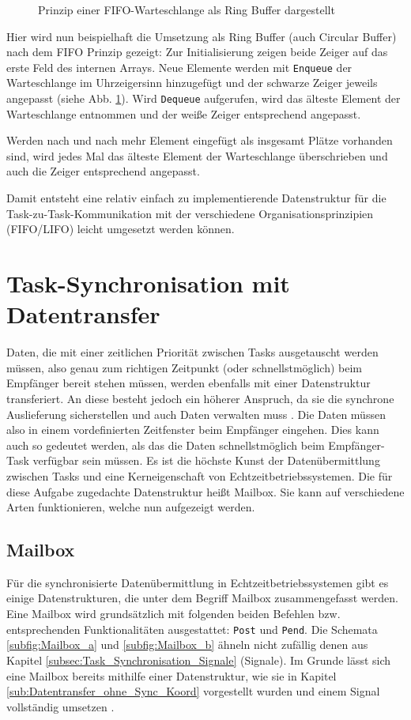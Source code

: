 \documentclass{llncs}
\begin{document}
\begin{figure}
	\centering
	\def\svgwidth{0.30\columnwidth}
	
	\caption{\label{fig:RingBuffer}Prinzip einer FIFO-Warteschlange als Ring Buffer dargestellt \autocite[vgl.][97]{Cooling2017}}
\end{figure}

Hier wird nun beispielhaft die Umsetzung als Ring Buffer (auch Circular Buffer) nach dem FIFO Prinzip gezeigt: Zur Initialisierung zeigen beide Zeiger auf das erste Feld des internen Arrays. Neue Elemente werden mit \texttt{Enqueue} der Warteschlange im Uhrzeigersinn hinzugefügt und der schwarze Zeiger jeweils angepasst (siehe Abb. \ref{fig:RingBuffer}). Wird \texttt{Dequeue} aufgerufen, wird das älteste Element der Warteschlange entnommen und der weiße Zeiger entsprechend angepasst.

Werden nach und nach mehr Element eingefügt als insgesamt Plätze vorhanden sind, wird jedes Mal das älteste Element der Warteschlange überschrieben und auch die Zeiger entsprechend angepasst.

Damit entsteht eine relativ einfach zu implementierende Datenstruktur für die Task-zu-Task-Kommunikation mit der verschiedene Organisationsprinzipien (FIFO/LIFO) leicht umgesetzt werden können.

\section{Task-Synchronisation mit Datentransfer}
\label{sub:Task_Synchronisation_Datentransfer}
Daten, die mit einer zeitlichen Priorität zwischen Tasks ausgetauscht werden müssen, also genau zum richtigen Zeitpunkt (oder schnellstmöglich) beim Empfänger bereit stehen müssen, werden ebenfalls mit einer Datenstruktur transferiert. An diese besteht jedoch ein höherer Anspruch, da sie die synchrone Auslieferung sicherstellen und auch Daten verwalten muss \autocite[vgl.][99]{Cooling2017}. Die Daten müssen also in einem vordefinierten Zeitfenster beim Empfänger eingehen. Dies kann auch so gedeutet werden, als das die Daten schnellstmöglich beim Empfänger-Task verfügbar sein müssen. Es ist die höchste Kunst der Datenübermittlung zwischen Tasks und eine Kerneigenschaft von Echtzeitbetriebssystemen. Die für diese Aufgabe zugedachte Datenstruktur heißt Mailbox. Sie kann auf verschiedene Arten funktionieren, welche nun aufgezeigt werden.

\subsection{Mailbox}
Für die synchronisierte Datenübermittlung in Echtzeitbetriebssystemen gibt es einige Datenstrukturen, die unter dem Begriff Mailbox zusammengefasst werden. Eine Mailbox wird grundsätzlich mit folgenden beiden Befehlen bzw. entsprechenden Funktionalitäten ausgestattet:
\texttt{Post} und \texttt{Pend}. Die Schemata \ref{subfig:Mailbox_a} und \ref{subfig:Mailbox_b} ähneln nicht zufällig denen aus Kapitel \ref{subsec:Task_Synchronisation_Signale} (Signale). Im Grunde lässt sich eine Mailbox bereits mithilfe einer Datenstruktur, wie sie in Kapitel \ref{sub:Datentransfer_ohne_Sync_Koord} vorgestellt wurden und einem Signal vollständig umsetzen \autocite[vgl.][99]{Cooling2017}.
\end{document}
